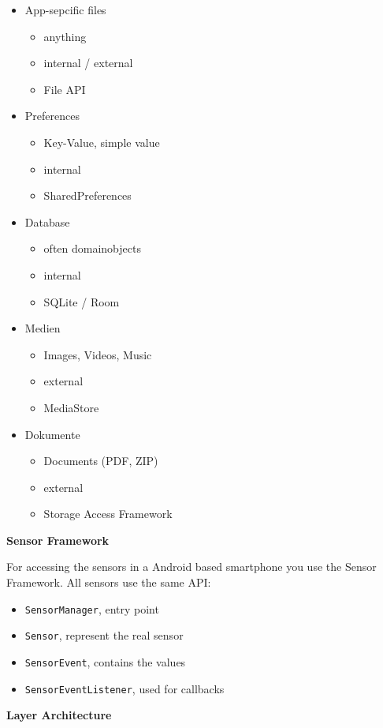 \documentclass[11pt,twoside,landscape]{article}
\begin{document}
\begin{multicols}{3}
\begin{itemize}
\item App-sepcific files
\begin{itemize}
\item anything
\item internal / external
\item File API
\end{itemize}
\item Preferences
\begin{itemize}
\item Key-Value, simple value
\item internal
\item SharedPreferences
\end{itemize}
\item Database
\begin{itemize}
\item often domainobjects
\item internal
\item SQLite / Room
\end{itemize}
\item Medien
\begin{itemize}
\item Images, Videos, Music
\item external
\item MediaStore
\end{itemize}
\item Dokumente
\begin{itemize}
\item Documents (PDF, ZIP)
\item external
\item Storage Access Framework
\end{itemize}
\end{itemize}


\textbf{Sensor Framework}

For accessing the sensors in a Android based smartphone you use the Sensor Framework.
All sensors use the same API:
\begin{itemize}
\item \texttt{SensorManager}, entry point
\item \texttt{Sensor}, represent the real sensor
\item \texttt{SensorEvent}, contains the values
\item \texttt{SensorEventListener}, used for callbacks
\end{itemize}


\textbf{Layer Architecture}


\end{multicols}
\end{document}
